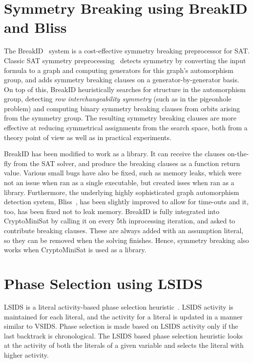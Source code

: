 \documentclass[final]{ieee}
\begin{document}
\section{Symmetry Breaking using BreakID and Bliss}
The BreakID~\cite{breakid2016} system is a cost-effective symmetry breaking preprocessor for SAT.
Classic SAT symmetry preprocessing~\cite{shatter2006} detects symmetry by converting the input formula to a graph and computing generators for this graph's automorphism group, and adds symmetry breaking clauses on a generator-by-generator basis.
On top of this, BreakID heuristically searches for structure in the automorphism group, detecting \emph{row interchangeability symmetry} (such as in the pigeonhole problem) and computing binary symmetry breaking clauses from orbits arising from the symmetry group.
The resulting symmetry breaking clauses are more effective at reducing symmetrical assignments from the search space, both from a theory point of view as well as in practical experiments.

BreakID has been modified to work as a library. It can receive the clauses on-the-fly from the SAT solver, and produce the breaking clauses as a function return value. Various small bugs have also be fixed, such as memory leaks, which were not an issue when ran as a single executable, but created isses when ran as a library. Furthermore, the underlying highly sophisticated graph automorphism detection system, Bliss~\cite{DBLP:conf/alenex/JunttilaK07}, has been slightly improved to allow for time-outs and it, too, has been fixed not to leak memory. BreakID is fully integrated into CryptoMiniSat by calling it on every 5th inprocessing iteration, and asked to contribute breaking clauses. These are always added with an assumption literal, so they can be removed when the solving finishes. Hence, symmetry breaking also works when CryptoMiniSat is used as a library.


\section{Phase Selection using LSIDS}
LSIDS is a literal activity-based phase selection heuristic~\cite{shaw2020designing}. LSIDS activity is maintained for each literal, and the activity for a literal is updated in a manner similar to VSIDS. Phase selection is made based on LSIDS activity only if the last backtrack is chronological. The LSIDS based phase selection heuristic looks at the activity of both the literals of a given variable and selects the literal with higher activity.
\end{document}
